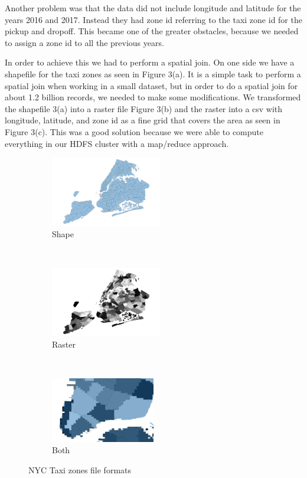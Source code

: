 \documentclass{sigkddExp}
\begin{document}
Another problem was that the data did not include longitude and latitude for the years 2016 and 2017. Instead they had zone id referring to the taxi zone id for the pickup and dropoff. This became one of the greater obstacles, because we needed to assign a zone id to all the previous years. 

In order to achieve this we had to perform a spatial join. On one side we have a shapefile for the taxi zones as seen in Figure 3(a). It is a simple task to perform a spatial join when working in a small dataset, but in order to do a spatial join for about 1.2 billion records, we needed to make some modifications. We transformed the shapefile 3(a) into a raster file Figure 3(b) and the raster into a csv with longitude, latitude, and zone id as a fine grid that covers the area as seen in Figure 3(c). This was a good solution because we were able to compute everything in our HDFS cluster with a map/reduce approach.


\begin{figure}
    \centering
    \begin{subfigure}[t]{0.25\textwidth}
        \centering
        \includegraphics[height=1.2in]{images/taxi_zones_shape}
        \caption{Shape}
        \label{fig:zones_shape}
    \end{subfigure}%
    ~ 
    \begin{subfigure}[t]{0.25\textwidth}
        \centering
        \includegraphics[height=1.2in]{images/taxi_zones_raster}
        \caption{Raster}
        \label{fig:zones_raster}
    \end{subfigure}
    ~ 
    \begin{subfigure}[t]{0.5\textwidth}
        \centering
        \includegraphics[width=0.5\textwidth]{images/both}
        \caption{Both}
        \label{fig:zones_both}
    \end{subfigure}
    \caption{NYC Taxi zones file formats}
    \label{fig:zones}
\end{figure}
\end{document}
